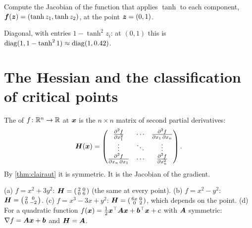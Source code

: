 \begin{exercise}
Compute the Jacobian of the function that applies $\tanh$ to each component,
$\bm{f}(\bm{z}) = (\tanh z_1, \tanh z_2)$, at the point $\bm{z} = (0, 1)$.
\end{exercise}
\begin{solution}
Diagonal, with entries $1 - \tanh^2 z_i$: at $(0, 1)$ this is
$\operatorname{diag}(1, 1 - \tanh^2 1) \approx \operatorname{diag}(1, 0.42)$.
\end{solution}

\section{The Hessian and the classification of critical points}\label{sec:hessian}

\begin{definition}\label{def:hessian}
The  of $f\colon\mathbb{R}^n\to\mathbb{R}$ at $\bm{x}$ is the $n\times n$ matrix
of second partial derivatives:
\[
  \bm{H}(\bm{x}) = \begin{pmatrix}
    \frac{\partial^2 f}{\partial x_1^2} & \cdots &
      \frac{\partial^2 f}{\partial x_1\,\partial x_n}\\
    \vdots & \ddots & \vdots\\
    \frac{\partial^2 f}{\partial x_n\,\partial x_1} & \cdots &
      \frac{\partial^2 f}{\partial x_n^2}
  \end{pmatrix}.
\]
By \cref{thm:clairaut} it is symmetric. It is the Jacobian of the gradient.
\end{definition}

\begin{example}[Hessians]\label{ex:hessians}
(a) $f = x^2 + 3y^2$: $\bm{H} = \left(\begin{smallmatrix} 2 & 0\\ 0 &
6\end{smallmatrix}\right)$ (the same at every point).
(b) $f = x^2 - y^2$: $\bm{H} = \left(\begin{smallmatrix} 2 & 0\\ 0 &
-2\end{smallmatrix}\right)$.
(c) $f = x^3 - 3x + y^2$: $\bm{H} = \left(\begin{smallmatrix} 6x & 0\\ 0 &
2\end{smallmatrix}\right)$, which depends on the point.
(d) For a quadratic function $f(\bm{x}) = \frac12\bm{x}^\top\bm{A}\bm{x} + \bm{b}^\top\bm{x} + c$
with $\bm{A}$ symmetric: $\nabla f = \bm{A}\bm{x} + \bm{b}$ and $\bm{H} = \bm{A}$.
\end{example}

